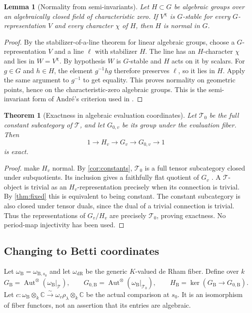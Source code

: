 \documentclass[11pt]{article}
\numberwithin{equation}{section}
\newtheorem{theorem}{Theorem}[section]
\newtheorem{lemma}[lemma]{Lemma}
\theoremstyle{definition}
\theoremstyle{remark}
\newcommand{\C}{\mathbb C}
\newcommand{\Tcal}{\mathcal T}
\newcommand{\Aut}{\operatorname{Aut}}
\newcommand{\dR}{\mathrm{dR}}
\newcommand{\B}{\mathrm B}
\begin{document}
\begin{lemma}[Normality from semi-invariants]\label{lem:normality}
Let $H\subset G$ be algebraic groups over an algebraically closed field of
characteristic zero. If $V^\chi$ is $G$-stable for every $G$-representation
$V$ and every character $\chi$ of $H$, then $H$ is normal in $G$.
\end{lemma}
\begin{proof}
By the stabilizer-of-a-line theorem for linear algebraic groups, choose a
$G$-representation $V$ and a line $\ell$ with stabilizer $H$. The line
has an $H$-character $\chi$ and lies in $W=V^\chi$. By hypothesis $W$
is $G$-stable and $H$ acts on it by scalars. For $g\in G$ and $h\in H$,
the element $g^{-1}hg$ therefore preserves $\ell$, so it lies in $H$.
Apply the same argument to $g^{-1}$ to get equality. This proves normality
on geometric points, hence on the characteristic-zero algebraic groups.
This is the semi-invariant form of Andr\'e's criterion used in
\cite{Andre,Mostaed}.
\end{proof}

\begin{theorem}[Exactness in algebraic evaluation coordinates]\label{thm:exact}
Let $\Tcal_0$ be the full constant subcategory of $\Tcal$, and let
$G_{0,v}$ be its group under the evaluation fiber. Then
\[
 1\longrightarrow H_v\longrightarrow G_v
 \longrightarrow G_{0,v}\longrightarrow1
\]
is exact.
\end{theorem}
\begin{proof}
 make $H_v$ normal. By
\cref{cor:constants}, $\Tcal_0$ is a full tensor subcategory closed
under subquotients. Its inclusion gives a faithfully flat quotient of
$G_v$ \cite[Proposition~2.21(a)]{DeligneMilne}. A $\Tcal$-object is
trivial as an $H_v$-representation precisely when its connection is
trivial. By \cref{thm:fixed} this is equivalent to being constant.
The constant subcategory is also closed under tensor duals, since the dual
of a trivial connection is trivial. Thus the representations of $G_v/H_v$ are precisely $\Tcal_0$, proving
exactness. No period-map injectivity has been used.
\end{proof}

\subsection{Changing to Betti coordinates}

Let $\omega_\B=\omega_{\B,s_0}$ and let $\omega_\dR$ be the generic
$K$-valued de Rham fiber. Define over $k$
\begin{equation}\label{eq:betti-groups}
 G_\B=\Aut^\otimes(\omega_\B|_\Tcal),\qquad
 G_{0,\B}=\Aut^\otimes(\omega_\B|_{\Tcal_0}),\qquad
 H_\B=\ker(G_\B\to G_{0,\B}).
\end{equation}
Let $c:\omega_\B\otimes_k\C\xrightarrow{\sim}
\omega_v\rho_\lambda\otimes_k\C$ be the actual comparison at $s_0$.
It is an isomorphism of fiber functors, not an assertion that its entries
are algebraic.
\end{document}
